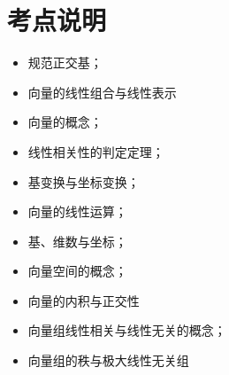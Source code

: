 \section{考点说明}
\begin{itemize}
\item 规范正交基；
\item 向量的线性组合与线性表示
\item 向量的概念；
\item 线性相关性的判定定理；
\item 基变换与坐标变换；
\item 向量的线性运算；
\item 基、维数与坐标；
\item 向量空间的概念；
\item 向量的内积与正交性
\item 向量组线性相关与线性无关的概念；
\item 向量组的秩与极大线性无关组
\end{itemize}

